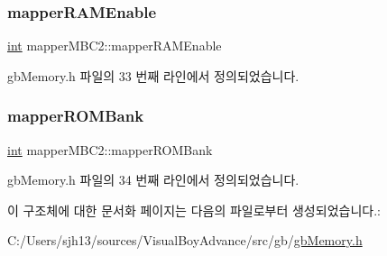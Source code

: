 \subsubsection{\texorpdfstring{mapper\+R\+A\+M\+Enable}{mapperRAMEnable}}
{\footnotesize\ttfamily \mbox{\hyperlink{_util_8cpp_a0ef32aa8672df19503a49fab2d0c8071}{int}} mapper\+M\+B\+C2\+::mapper\+R\+A\+M\+Enable}



gb\+Memory.\+h 파일의 33 번째 라인에서 정의되었습니다.

\mbox{\label{structmapper_m_b_c2_a608aebcc4a8b623a2feac2f78dbeb3c8}} 
\subsubsection{\texorpdfstring{mapper\+R\+O\+M\+Bank}{mapperROMBank}}
{\footnotesize\ttfamily \mbox{\hyperlink{_util_8cpp_a0ef32aa8672df19503a49fab2d0c8071}{int}} mapper\+M\+B\+C2\+::mapper\+R\+O\+M\+Bank}



gb\+Memory.\+h 파일의 34 번째 라인에서 정의되었습니다.



이 구조체에 대한 문서화 페이지는 다음의 파일로부터 생성되었습니다.\+:\begin{DoxyCompactItemize}
\item 
C\+:/\+Users/sjh13/sources/\+Visual\+Boy\+Advance/src/gb/\mbox{\hyperlink{gb_memory_8h}{gb\+Memory.\+h}}\end{DoxyCompactItemize}
